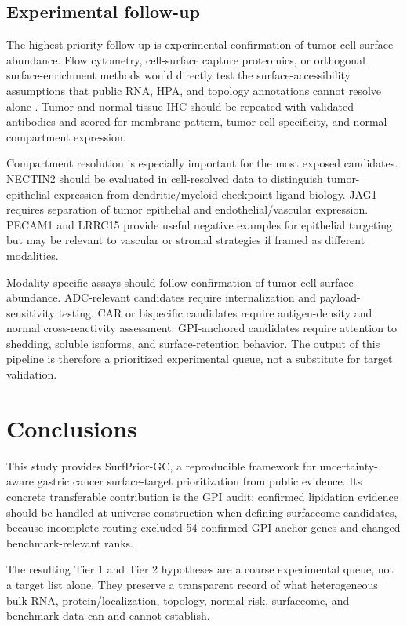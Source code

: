 \documentclass[preprint,12pt,authoryear]{elsarticle}
\begin{document}
\subsection{Experimental follow-up}

The highest-priority follow-up is experimental confirmation of tumor-cell surface abundance. Flow cytometry, cell-surface capture proteomics, or orthogonal surface-enrichment methods would directly test the surface-accessibility assumptions that public RNA, HPA, and topology annotations cannot resolve alone \citep{bauschfluck2015cspa,uhlen2015hpa,thul2017subcellular}. Tumor and normal tissue IHC should be repeated with validated antibodies and scored for membrane pattern, tumor-cell specificity, and normal compartment expression.

Compartment resolution is especially important for the most exposed candidates. NECTIN2 should be evaluated in cell-resolved data to distinguish tumor-epithelial expression from dendritic/\allowbreak{}myeloid checkpoint-ligand biology. JAG1 requires separation of tumor epithelial and endothelial/\allowbreak{}vascular expression. PECAM1 and LRRC15 provide useful negative examples for epithelial targeting but may be relevant to vascular or stromal strategies if framed as different modalities.

Modality-specific assays should follow confirmation of tumor-cell surface abundance. ADC-relevant candidates require internalization and payload-sensitivity testing. CAR or bispecific candidates require antigen-density and normal cross-reactivity assessment. GPI-anchored candidates require attention to shedding, soluble isoforms, and surface-retention behavior. The output of this pipeline is therefore a prioritized experimental queue, not a substitute for target validation.

\FloatBarrier
\section{Conclusions}

This study provides SurfPrior-GC, a reproducible framework for uncertainty-aware gastric cancer surface-target prioritization from public evidence. Its concrete transferable contribution is the GPI audit: confirmed lipidation evidence should be handled at universe construction when defining surfaceome candidates, because incomplete routing excluded 54 confirmed GPI-anchor genes and changed benchmark-relevant ranks.

The resulting Tier 1 and Tier 2 hypotheses are a coarse experimental queue, not a target list alone. They preserve a transparent record of what heterogeneous bulk RNA, protein/\allowbreak{}localization, topology, normal-risk, surfaceome, and benchmark data can and cannot establish.
\end{document}
